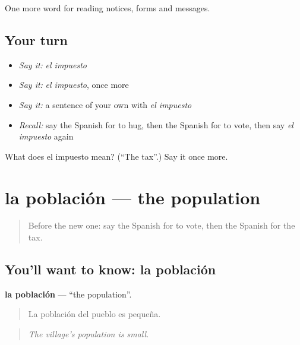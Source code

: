 \begin{grammarlens}[title={What you've built}]
One more word for reading notices, forms and messages.
\end{grammarlens}

\subsection*{Your turn}
\begin{itemize}
\raggedright
  \item \emph{Say it:} \emph{el impuesto}
  \item \emph{Say it:} \emph{el impuesto}, once more
  \item \emph{Say it:} a sentence of your own with \emph{el impuesto}
  \item \emph{Recall:} say the Spanish for to hug, then the Spanish for to vote, then say \emph{el impuesto} again
\end{itemize}

\begin{tcolorbox}[breakable,colback=teal!4,colframe=teal!35!black,title={Before you move on}]
What does el impuesto mean? (\textquotedblleft{}The tax\textquotedblright{}.) Say it once more.
\end{tcolorbox}
\section[la población]{la población — the population}

\label{lesson:ES-C507-poblacion}



\begin{quote}
Before the new one: say the Spanish for to vote, then the Spanish for the tax.
\end{quote}

\subsection*{You'll want to know: la población}
\textbf{la población} — \textquotedblleft{}the population\textquotedblright{}.

\begin{quote}
La población del pueblo es pequeña.
\end{quote}

\begin{quote}
\emph{The village's population is small.}
\end{quote}

